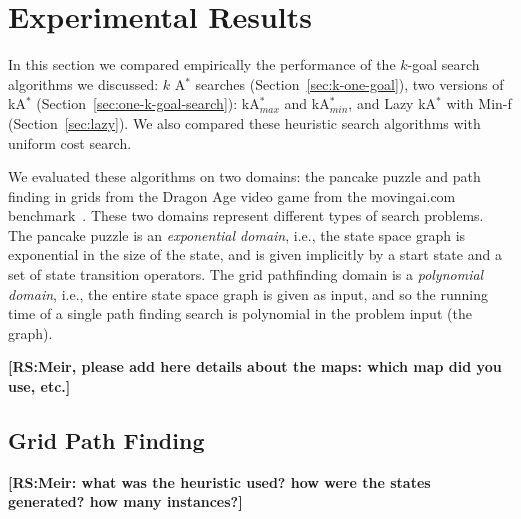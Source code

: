 \documentclass{aicom2e}
\newcommand{\kgs}{$k$-goal search}
\newcommand{\astar}{A$^*$}
\newcommand{\kastar}{kA$^*$}
\newcommand{\kastarmin}{kA$^*_{min}$}
\newcommand{\kastarmax}{kA$^*_{max}$}
\newcommand{\minf}{Min-f}
\newcommand{\roni}[1]{\textbf{[RS:#1]}}
\begin{document}
\section{Experimental Results}

In this section we compared empirically the performance of the \kgs{} algorithms we discussed: $k$ \astar{} searches (Section~\ref{sec:k-one-goal}), two versions of \kastar{} (Section~\ref{sec:one-k-goal-search}): \kastarmax{} and \kastarmin{}, and Lazy \kastar{} with \minf{} (Section~\ref{sec:lazy}). We also compared these heuristic search algorithms with uniform cost search. 

We evaluated these algorithms on two domains: the pancake puzzle and path finding in grids from the Dragon Age video game from the movingai.com benchmark~\cite{sturtevant2012benchmarks}. These two domains represent different types of search problems. The pancake puzzle is an {\em exponential domain}, i.e., the state space graph is exponential in the size of the state, and is given implicitly by a start state and a set of state transition operators. The grid pathfinding domain is a {\em polynomial domain}, i.e., the entire state space graph is given as input, and so the running time of a single path finding search is polynomial in the problem input (the graph). 

\roni{Meir, please add here details about the maps: which map did you use, etc.}
\subsection{Grid Path Finding}
\roni{Meir: what was the heuristic used? how were the states generated? how many instances?}
\end{document}
